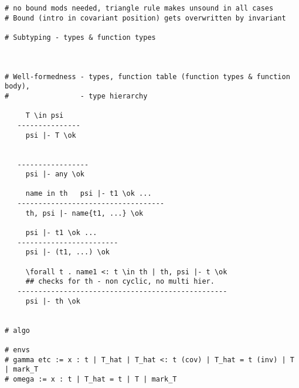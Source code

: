 \documentclass{report} %
\begin{document}
\begin{verbatim}
# no bound mods needed, triangle rule makes unsound in all cases
# Bound (intro in covariant position) gets overwritten by invariant

# Subtyping - types & function types



# Well-formedness - types, function table (function types & function body),
#                 - type hierarchy

     T \in psi
   ---------------
     psi |- T \ok

     
   -----------------
     psi |- any \ok

     name in th   psi |- t1 \ok ...
   -----------------------------------
     th, psi |- name{t1, ...} \ok

     psi |- t1 \ok ...
   ------------------------
     psi |- (t1, ...) \ok 

     \forall t . name1 <: t \in th | th, psi |- t \ok 
     ## checks for th - non cyclic, no multi hier.
   --------------------------------------------------
     psi |- th \ok 


# algo

# envs
# gamma etc := x : t | T_hat | T_hat <: t (cov) | T_hat = t (inv) | T | mark_T 
# omega := x : t | T_hat = t | T | mark_T

\end{verbatim}
\end{document}
